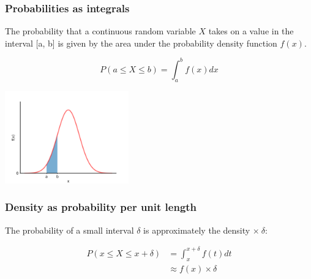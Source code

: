 \documentclass[10pt]{beamer}
\begin{document}
\begin{frame}
\frametitle{Probabilities as integrals}

The probability that a continuous random variable $X$ takes on a value in the interval [a, b] is given by the area under the probability density function $f(x)$.

\vspace{-0.25cm}

\begin{equation*}
P(a \leq X \leq b) = \int_a^b f(x) dx
\end{equation*}

\vspace{-0.5cm}
\begin{center}
\includegraphics[height=4cm]{images/normal_area.png}
\end{center}

\end{frame}

\begin{frame}
\frametitle{Density as probability per unit length}

The probability of a small interval $\delta$ is approximately the density
$\times \ \delta$:

\vspace{-0.3cm}

\begin{align*}
P(x \leq X \leq x + \delta) &= \int_x^{x+\delta} f(t) dt\\
& \approx f(x) \times \delta\\
\end{align*}

\vspace{-0.5cm}


\end{frame}
\end{document}
